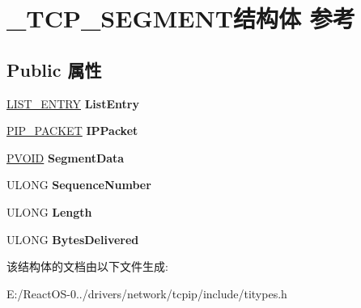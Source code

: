 \hypertarget{struct___t_c_p___s_e_g_m_e_n_t}{}\section{\+\_\+\+T\+C\+P\+\_\+\+S\+E\+G\+M\+E\+N\+T结构体 参考}
\label{struct___t_c_p___s_e_g_m_e_n_t}
\subsection*{Public 属性}
\begin{DoxyCompactItemize}
\item 
\mbox{\label{struct___t_c_p___s_e_g_m_e_n_t_a0acfc58463f3f6bf60f9ca128e8e23a3}} 
\hyperlink{struct___l_i_s_t___e_n_t_r_y}{L\+I\+S\+T\+\_\+\+E\+N\+T\+RY} {\bfseries List\+Entry}
\item 
\mbox{\label{struct___t_c_p___s_e_g_m_e_n_t_af2aa1f55d9310d8f68b3c672a014843c}} 
\hyperlink{struct___i_p___p_a_c_k_e_t}{P\+I\+P\+\_\+\+P\+A\+C\+K\+ET} {\bfseries I\+P\+Packet}
\item 
\mbox{\label{struct___t_c_p___s_e_g_m_e_n_t_a2c966f2e71a3356a3bc28ceba752515f}} 
\hyperlink{interfacevoid}{P\+V\+O\+ID} {\bfseries Segment\+Data}
\item 
\mbox{\label{struct___t_c_p___s_e_g_m_e_n_t_a94d1ccea9397036b73260d521db1e5c9}} 
U\+L\+O\+NG {\bfseries Sequence\+Number}
\item 
\mbox{\label{struct___t_c_p___s_e_g_m_e_n_t_afcef2016140580bc9396303870d44ee0}} 
U\+L\+O\+NG {\bfseries Length}
\item 
\mbox{\label{struct___t_c_p___s_e_g_m_e_n_t_a65dfda64dfdb783c6931ad5db21f7718}} 
U\+L\+O\+NG {\bfseries Bytes\+Delivered}
\end{DoxyCompactItemize}


该结构体的文档由以下文件生成\+:\begin{DoxyCompactItemize}
\item 
E\+:/\+React\+O\+S-\/0../drivers/network/tcpip/include/titypes.\+h\end{DoxyCompactItemize}
